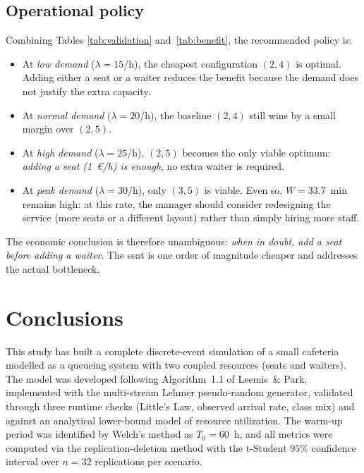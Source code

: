 \documentclass[11pt,a4paper]{article}
\begin{document}
\subsection{Operational policy}
Combining Tables \ref{tab:validation} and~\ref{tab:benefit}, the
recommended policy is:

\begin{itemize}
\item At \emph{low demand} ($\lambda = 15$/h), the cheapest
configuration $(2,4)$ is optimal. Adding either a seat or a waiter
reduces the benefit because the demand does not justify the extra
capacity.
\item At \emph{normal demand} ($\lambda = 20$/h), the baseline $(2,4)$
still wins by a small margin over $(2,5)$.
\item At \emph{high demand} ($\lambda = 25$/h), $(2,5)$ becomes the
only viable optimum: \emph{adding a seat (1~€/h) is enough}, no
extra waiter is required.
\item At \emph{peak demand} ($\lambda = 30$/h), only $(3,5)$ is viable.
Even so, $W = 33.7$~min remains high: at this rate, the manager should
consider redesigning the service (more seats or a different layout)
rather than simply hiring more staff.
\end{itemize}

The economic conclusion is therefore unambiguous: \emph{when in doubt,
add a seat before adding a waiter}. The seat is one order of magnitude
cheaper and addresses the actual bottleneck.

\section{Conclusions}

This study has built a complete discrete-event simulation of a small
cafeteria modelled as a queueing system with two coupled resources
(seats and waiters). The model was developed following Algorithm~1.1
of Leemis~\& Park, implemented with the multi-stream Lehmer
pseudo-random generator, validated through three runtime checks
(Little's Law, observed arrival rate, class mix) and against an
analytical lower-bound model of resource utilization. The warm-up
period was identified by Welch's method as $T_0 = 60$~h, and all
metrics were computed via the replication-deletion method with the
t-Student $95\%$ confidence interval over $n = 32$ replications per
scenario.
\end{document}
